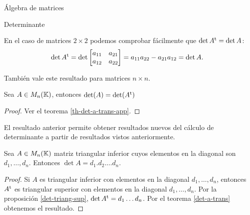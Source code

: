 \begin{chapter}{\'Algebra de matrices}
\begin{section}{Determinante}
\begin{observacion*}
    En  el caso  de matrices $2 \times 2$ podemos comprobar fácilmente que $\det A^{\operatorname{t}} = \det A$:
    $$
    \det A^{\operatorname{t}} = \det \begin{bmatrix} a_{11} & a_{21} \\ a_{12}& a_{22}\end{bmatrix} = 
    a_{11}a_{22} - a_{21}a_{12} = \det A. 
    $$
\end{observacion*}

También vale este resultado para matrices $n \times n$.

\begin{teorema}\label{det-a-trans} Sea $A \in M_n(\mathbb K)$,  entonces 
    $\det(A) = \det(A^{\operatorname{t}})$
\end{teorema}
\begin{proof}
    Ver el teorema \ref{th-det-a-trans-app}.
\end{proof}
    
    El resultado anterior permite obtener resultados nuevos del cálculo de determinante a partir de resultados vistos anteriormente. 
    
    
    \begin{proposicion}\label{det-triang-inf}
    Sea $A \in M_n(\mathbb K)$ matriz triangular  inferior cuyos elementos en la diagonal son $d_1,\ldots,d_n$. Entonces $\det A = d_1.d_2.\ldots d_n$.
    \end{proposicion}
    \begin{proof}
        Si $A$ es triangular inferior con elementos en la diagonal $d_1,\ldots,d_n$,  entonces $A^{\operatorname{t}}$ es triangular superior con  elementos en la diagonal $d_1,\ldots,d_n$. Por la proposición \ref{det-triang-sup}, $\det A^{\operatorname{t}} = d_1\ldots d_n$. Por el teorema  \ref{det-a-trans} obtenemos el resultado. 
    \end{proof}



\end{section}
\end{chapter}
